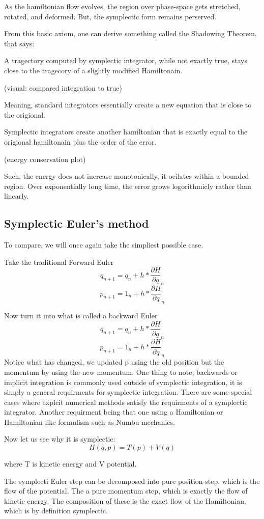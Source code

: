 As the hamiltonian flow evolves, the region over phase-space gets stretched, rotated, and deformed. But, the symplectic form remains perserved.

From this basic axiom, one can derive something called the Shadowing Theorem, that says:

A tragectory computed by symplectic integrator, while not exactly true, stays close to the tragecory of a slightly modified Hamiltonain.

(visual: compared integration to true)

Meaning, standard integrators essentially create a new equation that is close to the origional.

Symplectic integrators create another hamiltonian that is exactly equal to the origional hamiltonain plus the order of the error.

(energy conservation plot)

Such, the energy does not increase monotonically, it ocilates within a bounded region. Over exponentially long time, the error grows logorithmicly rather than linearly.

\subsection{Symplectic Euler's method}

To compare, we will once again take the simpliest possible case.

Take the traditional Forward Euler
\[
q_{n+1} = q_n + h * \frac{\partial H}{\partial q}_n
\]
\[
p_{n+1}=1_n +h * \frac{\partial H}{\partial q}_n
\]

Now turn it into what is called a backward Euler
\[
q_{n+1} = q_n + h * \frac{\partial H}{\partial q}_n
\]
\[
p_{n+1}=1_n +h * \frac{\partial H}{\partial q}_n
\]
Notice what has changed, we updated p using the old position but the momentum by using the new momentum. One thing to note, backwards or implicit integration is commonly used outside of symplectic integration, it is simply a general requirments for symplectic integration. There are some special cases where explcit numerical methods satisfy the requirments of a symplectic integrator. Another requirment being that one using a Hamiltonian or Hamiltonian like formulism such as Numbu mechanics.

Now let us see why it is symplectic:
\[
H(q,p) = T(p) + V(q)
\]

where T is kinetic energy and V potential.

The symplecti Euler step can be decomposed into pure position-step, which is the flow of the potential. The a pure momentum step, which is exactly the flow of kinetic energy. The composition of these is the exact flow of the Hamiltonian, which is by definition symplectic.

